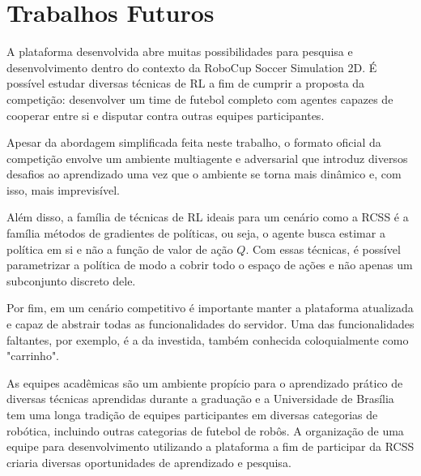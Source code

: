 \section{Trabalhos Futuros}

A plataforma desenvolvida abre muitas possibilidades para pesquisa e desenvolvimento dentro do contexto da RoboCup Soccer Simulation 2D. É possível estudar diversas técnicas de RL a fim de cumprir a proposta da competição: desenvolver um time de futebol completo com agentes capazes de cooperar entre si e disputar contra outras equipes participantes.

Apesar da abordagem simplificada feita neste trabalho, o formato oficial da competição envolve um ambiente multiagente e adversarial que introduz diversos desafios ao aprendizado uma vez que o ambiente se torna mais dinâmico e, com isso, mais imprevisível.

Além disso, a família de técnicas de RL ideais para um cenário como a RCSS é a família métodos de gradientes de políticas, ou seja, o agente busca estimar a política em si e não a função de valor de ação $Q$. Com essas técnicas, é possível parametrizar a política de modo a cobrir todo o espaço de ações e não apenas um subconjunto discreto dele.

Por fim, em um cenário competitivo é importante manter a plataforma atualizada e capaz de abstrair todas as funcionalidades do servidor. Uma das funcionalidades faltantes, por exemplo, é a da investida, também conhecida coloquialmente como "carrinho".

As equipes acadêmicas são um ambiente propício para o aprendizado prático de diversas técnicas aprendidas durante a graduação e a Universidade de Brasília tem uma longa tradição de equipes participantes em diversas categorias de robótica, incluindo outras categorias de futebol de robôs. A organização de uma equipe para desenvolvimento utilizando a plataforma a fim de participar da RCSS criaria diversas oportunidades de aprendizado e pesquisa.

